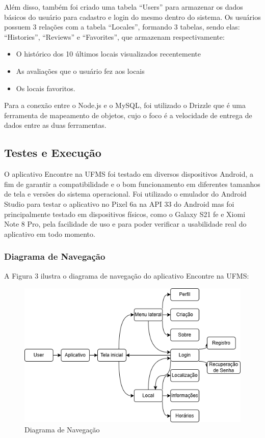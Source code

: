     Além disso, também foi criado uma tabela ``Users'' para armazenar os dados básicos do usuário para cadastro e login do mesmo dentro do sistema. Os usuários possuem 3 relações com a tabela ``Locales'', formando 3 tabelas, sendo elas: ``Histories'', ``Reviews'' e ``Favorites'', que armazenam respectivamente:
    
    \begin{itemize}
        \item O histórico dos 10 últimos locais visualizados recentemente
        \item As avaliações que o usuário fez aos locais 
        \item Os locais favoritos.
    \end{itemize}

    Para a conexão entre o Node.js e o MySQL, foi utilizado o Drizzle que é uma ferramenta de mapeamento de objetos, cujo o foco é a velocidade de entrega de dados entre as duas ferramentas. 

\subsection{Testes e Execução}

    O aplicativo Encontre na UFMS foi testado em diversos dispositivos Android, a fim de garantir a compatibilidade e o bom funcionamento em diferentes tamanhos de tela e versões do sistema operacional. Foi utilizado o emulador do Android Studio para testar o aplicativo no Pixel 6a na API 33 do Android mas foi principalmente testado em dispositivos físicos, como o Galaxy S21 fe e Xiomi Note 8 Pro, pela facilidade de uso e para poder verificar a usabilidade real do aplicativo em todo momento.

\subsubsection{Diagrama de Navegação}

    A Figura 3 ilustra o diagrama de navegação do aplicativo Encontre na UFMS:

    \begin{figure}[h]
        \centering
        \includegraphics[width=120mm,height=70mm]{imagens/navegacao.png}
        \caption{\scriptsize Diagrama de Navegação}
        \label{fig:diagrama-navegacao}
    \end{figure}

